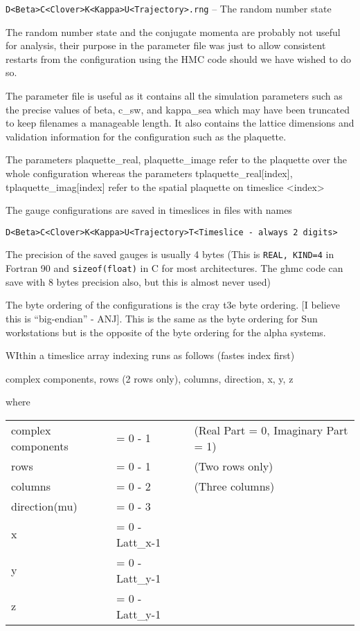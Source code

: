 \documentclass[12pt]{article}
\begin{document}
{\tt D<Beta>C<Clover>K<Kappa>U<Trajectory>.rng} -- The random number state

The random number state and the conjugate momenta are probably not useful
for analysis, their purpose in the parameter file was just to allow 
consistent restarts from the configuration using the HMC code should 
we have wished to do so.

The parameter file is useful as it contains all the simulation  parameters
such as the precise values of beta, c\_sw, and kappa\_sea which may have
been truncated to keep filenames a manageable length. It also contains 
the lattice dimensions and validation information for the 
configuration such as the plaquette.

The parameters plaquette\_real, plaquette\_image refer to the plaquette 
over the whole configuration
whereas the parameters tplaquette\_real[index], tplaquette\_imag[index]
refer to the spatial plaquette on timeslice <index>

The gauge configurations are saved in timeslices in files with names
\begin{verbatim}
D<Beta>C<Clover>K<Kappa>U<Trajectory>T<Timeslice - always 2 digits>
\end{verbatim}
The precision of the saved gauges is usually 4 bytes 
(This is {\tt REAL, KIND=4} in Fortran 90 and
{\tt sizeof(float)} in C for  most architectures.
The ghmc code can save with 8 bytes precision also, but this
is almost never used)

The byte ordering of the configurations is the cray t3e byte ordering.
[I believe this is ``big-endian'' - ANJ].
This is the same as the byte ordering for Sun workstations but 
is the opposite of the byte ordering for the alpha systems.

WIthin a timeslice array indexing runs as follows (fastes index first)

complex components, rows (2 rows only), columns, direction, x, y, z

where 
\begin{tabular}{lll}
      complex components &= 0 - 1    &(Real Part = 0, Imaginary Part = 1)\\
      rows               &= {0 - 1}  &(Two rows only) \\
      columns            &= {0 - 2}  &(Three columns)\\
      direction(mu)      &= {0 - 3} &\\
      x                  &= {0 - Latt\_x-1} & \\
      y                  &= {0 - Latt\_y-1} & \\
      z                  &= {0 - Latt\_y-1} & 
\end{tabular}
\end{document}
